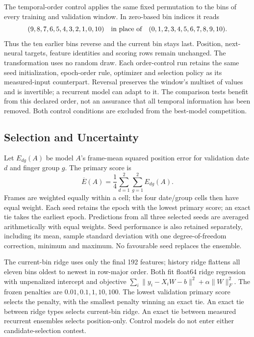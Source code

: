 The temporal-order control applies the same fixed permutation to the bins of
every training and validation window. In zero-based bin indices it reads
\[
 (9,8,7,6,5,4,3,2,1,0,10)
 \quad\hbox{in place of}\quad (0,1,2,3,4,5,6,7,8,9,10).
\]
Thus the ten earlier bins reverse and the current bin stays last. Position,
next-neural targets, feature identities and scoring rows remain unchanged.
The transformation uses no random draw. Each order-control run retains the
same seed initialization, epoch-order rule, optimizer and selection policy as
its measured-input counterpart. Reversal preserves the window's multiset of
values and is invertible; a recurrent model can adapt to it. The comparison
tests benefit from this declared order, not an assurance that all temporal
information has been removed. Both control conditions are excluded from the
best-model competition.

\subsection{Selection and Uncertainty}

Let $E_{dg}(A)$ be model $A$'s frame-mean squared position error for validation
date $d$ and finger group $g$. The primary score is
\[
 \overline E(A)=\frac14\sum_{d=1}^{2}\sum_{g=1}^{2}E_{dg}(A).
\]
Frames are weighted equally within a cell; the four date/group cells then have
equal weight. Each seed retains the epoch with the lowest primary score;
an exact tie takes the earliest epoch. Predictions from all three selected
seeds are averaged arithmetically with equal weights. Seed performance is
also retained separately, including its mean, sample standard deviation with
one degree-of-freedom correction, minimum and maximum. No favourable seed
replaces the ensemble.

The current-bin ridge uses only the final 192 features; history ridge flattens
all eleven bins oldest to newest in row-major order. Both fit float64 ridge
regression with unpenalized intercept and objective
$\sum_i\lVert y_i-X_iW-b\rVert^2+\alpha\lVert W\rVert_F^2$.
The frozen penalties are $0.01,0.1,1,10,100$. The lowest validation primary
score selects the penalty, with the smallest penalty winning an exact tie.
An exact tie between ridge types selects current-bin ridge. An exact tie
between measured recurrent ensembles selects position-only. Control models
do not enter either candidate-selection contest.

